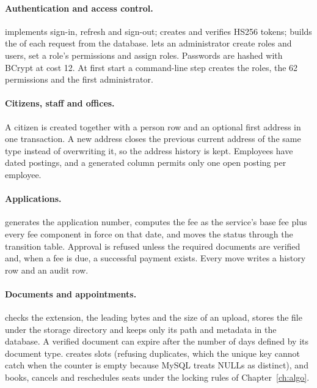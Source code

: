 \paragraph{Authentication and access control.}
 implements sign-in, refresh and sign-out;  creates and
verifies HS256 tokens;  builds the  of each request from
the database.  lets an administrator create roles and users, set a role's
permissions and assign roles. Passwords are hashed with BCrypt at cost 12. At first start
a command-line step creates the roles, the 62 permissions and the first administrator.

\paragraph{Citizens, staff and offices.}
A citizen is created together with a person row and an optional first address in one
transaction. A new address closes the previous current address of the same type instead of
overwriting it, so the address history is kept. Employees have dated postings, and a
generated column permits only one open posting per employee.

\paragraph{Applications.}
 generates the application number, computes the fee as the service's
base fee plus every fee component in force on that date, and moves the status through the
transition table. Approval is refused unless the required documents are verified and, when a
fee is due, a successful payment exists. Every move writes a history row and an audit row.

\paragraph{Documents and appointments.}
 checks the extension, the leading bytes and the size of an upload,
stores the file under the storage directory and keeps only its path and metadata in the
database. A verified document can expire after the number of days defined by its document
type.  creates slots (refusing duplicates, which the unique key
cannot catch when the counter is empty because MySQL treats NULLs as distinct), and books,
cancels and reschedules seats under the locking rules of Chapter~\ref{ch:algo}.


